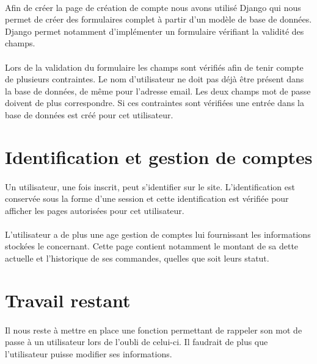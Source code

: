 \documentclass[twoside,UTF8]{EPURapport}
\begin{document}
        \paragraph{}Afin de créer la page de création de compte nous avons utilisé Django qui nous permet de créer des formulaires complet à partir d'un modèle de base de données. Django permet notamment d'implémenter un formulaire vérifiant la validité des champs.

        \paragraph{}Lors de la validation du formulaire les champs sont vérifiés afin de tenir compte de plusieurs contraintes. Le nom d'utilisateur ne doit pas déjà être présent dans la base de données, de même pour l'adresse email. Les deux champs mot de passe doivent de plus correspondre. Si ces contraintes sont vérifiées une entrée dans la base de données est créé pour cet utilisateur.

    \section{Identification et gestion de comptes}

        \paragraph{}Un utilisateur, une fois inscrit, peut s'identifier sur le site. L'identification est conservée sous la forme d'une session et cette identification est vérifiée pour afficher les pages autorisées pour cet utilisateur.

        \paragraph{}L'utilisateur a de plus une age gestion de comptes lui fournissant les informations stockées le concernant. Cette page contient notamment le montant de sa dette actuelle et l'historique de ses commandes, quelles que soit leurs statut.

    \section{Travail restant}
        
        \paragraph{}Il nous reste à mettre en place une fonction permettant de rappeler son mot de passe à un utilisateur lors de l'oubli de celui-ci. Il faudrait de plus que l'utilisateur puisse modifier ses informations.
\end{document}
